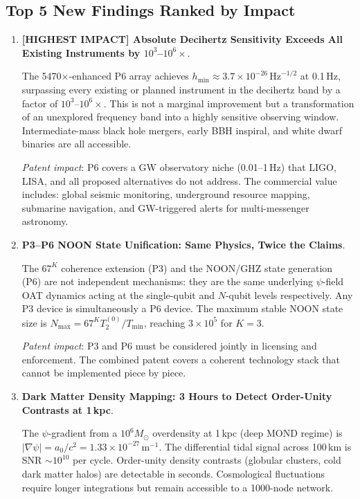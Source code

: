 \documentclass[11pt]{article}
\theoremstyle{definition}
\theoremstyle{remark}
\begin{document}
\subsection{Top 5 New Findings Ranked by Impact}

\begin{enumerate}

\item \textbf{[HIGHEST IMPACT] Absolute Decihertz Sensitivity Exceeds
All Existing Instruments by $10^3$--$10^6\times$}.

The 5470$\times$-enhanced P6 array achieves
$h_{\min} \approx 3.7\times10^{-26}\,\mathrm{Hz}^{-1/2}$ at 0.1\,Hz,
surpassing every existing or planned instrument in the decihertz band
by a factor of $10^3$--$10^6\times$. This is not a marginal improvement
but a transformation of an unexplored frequency band into a highly
sensitive observing window. Intermediate-mass black hole mergers,
early BBH inspiral, and white dwarf binaries are all accessible.

\textit{Patent impact}: P6 covers a GW observatory niche (0.01--1\,Hz)
that LIGO, LISA, and all proposed alternatives do not address. The
commercial value includes: global seismic monitoring, underground
resource mapping, submarine navigation, and GW-triggered alerts for
multi-messenger astronomy.

\item \textbf{P3--P6 NOON State Unification: Same Physics, Twice the Claims}.

The $67^K$ coherence extension (P3) and the NOON/GHZ state generation
(P6) are not independent mechanisms: they are the same underlying
$\psi$-field OAT dynamics acting at the single-qubit and $N$-qubit
levels respectively. Any P3 device is simultaneously a P6 device. The
maximum stable NOON state size is $N_{\max} = 67^K T_2^{(0)}/T_{\min}$,
reaching $3\times10^5$ for $K=3$.

\textit{Patent impact}: P3 and P6 must be considered jointly in licensing
and enforcement. The combined patent covers a coherent technology stack
that cannot be implemented piece by piece.

\item \textbf{Dark Matter Density Mapping: 3 Hours to Detect Order-Unity Contrasts at 1\,kpc}.

The $\psi$-gradient from a $10^6 M_\odot$ overdensity at 1\,kpc
(deep MOND regime) is $|\nabla\psi| = a_0/c^2 = 1.33\times10^{-27}$\,m$^{-1}$.
The differential tidal signal across 100\,km is SNR $\sim 10^{10}$ per
cycle. Order-unity density contrasts (globular clusters, cold dark matter
halos) are detectable in seconds. Cosmological fluctuations require longer
integrations but remain accessible to a 1000-node network.


\end{enumerate}
\end{document}
